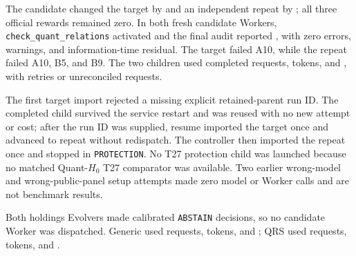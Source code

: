 
 The
candidate changed the target by \QCELiveTarget{} and an independent repeat by
\QCELiveRepeat{}; all three official rewards remained zero. In both fresh
candidate Workers, \texttt{check\_quant\_relations} activated and the final
audit reported \QCELiveRelationAudit{}, with zero errors, warnings, and
information-time residual. The target failed A10, while the repeat failed A10,
B5, and B9. The two children used \QCELiveRequests{} completed requests,
\QCELiveTokens{} tokens, and \QCELiveCost{}, with \QCELiveRetries{} retries or
unreconciled requests.

The first target import rejected a missing explicit retained-parent run ID.
The completed child survived the service restart and was reused with no new
attempt or cost; after the run ID was supplied, resume imported the target once
and advanced to repeat without redispatch. The controller then imported the
repeat once and stopped in \texttt{PROTECTION}. No T27 protection child was
launched because no matched Quant-$H_0$ T27 comparator was available. Two
earlier wrong-model and wrong-public-panel setup attempts made zero model or
Worker calls and are not benchmark results.


 Both holdings Evolvers made calibrated
\texttt{ABSTAIN} decisions, so no candidate Worker was dispatched. Generic used
\AZeroHoldingsGenericRequests{} requests, \AZeroHoldingsGenericTokens{} tokens,
and \AZeroHoldingsGenericCost{}; QRS used \AZeroHoldingsQRSRequests{} requests,
\AZeroHoldingsQRSTokens{} tokens, and \AZeroHoldingsQRSCost{}.

